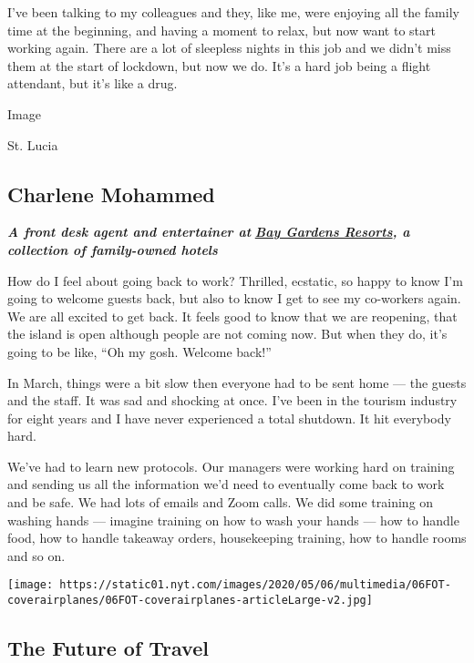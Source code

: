 I've been talking to my colleagues and they, like me, were enjoying all
the family time at the beginning, and having a moment to relax, but now
want to start working again. There are a lot of sleepless nights in this
job and we didn't miss them at the start of lockdown, but now we do.
It's a hard job being a flight attendant, but it's like a drug.

Image

St. Lucia

\hypertarget{charlene-mohammed}{%
\subsection{Charlene Mohammed}\label{charlene-mohammed}}

\emph{\textbf{A front desk agent and entertainer at}}
\textbf{\href{https://www.baygardensresorts.com/}{\emph{Bay Gardens
Resorts}}\emph{, a collection of family-owned hotels}}

How do I feel about going back to work? Thrilled, ecstatic, so happy to
know I'm going to welcome guests back, but also to know I get to see my
co-workers again. We are all excited to get back. It feels good to know
that we are reopening, that the island is open although people are not
coming now. But when they do, it's going to be like, ``Oh my gosh.
Welcome back!''

In March, things were a bit slow then everyone had to be sent home ---
the guests and the staff. It was sad and shocking at once. I've been in
the tourism industry for eight years and I have never experienced a
total shutdown. It hit everybody hard.

We've had to learn new protocols. Our managers were working hard on
training and sending us all the information we'd need to eventually come
back to work and be safe. We had lots of emails and Zoom calls. We did
some training on washing hands --- imagine training on how to wash your
hands --- how to handle food, how to handle takeaway orders,
housekeeping training, how to handle rooms and so on.

\href{https://www.nytimes.com/interactive/2020/05/06/travel/coronavirus-travel-questions.html}{}

\texttt{[image: https://static01.nyt.com/images/2020/05/06/multimedia/06FOT-coverairplanes/06FOT-coverairplanes-articleLarge-v2.jpg]}

\hypertarget{the-future-of-travel}{%
\subsection{The Future of Travel}\label{the-future-of-travel}}

